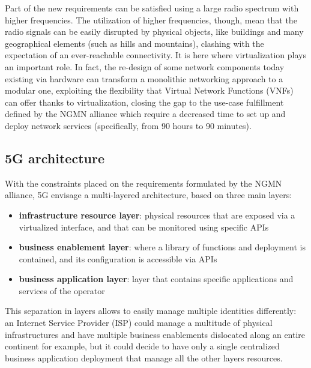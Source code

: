 Part of the new requirements can be satisfied using a large radio spectrum with
higher frequencies. The utilization of higher frequencies, though, mean that the
radio signals can be easily disrupted by physical objects, like buildings and
many geographical elements (such as hills and mountains), clashing with the
expectation of an ever-reachable connectivity. It is here where virtualization
plays an important role. In fact, the re-design of some network components today
existing via hardware can transform a monolithic networking approach to a 
modular one, exploiting the flexibility that Virtual Network Functions 
(VNFs) can offer thanks to virtualization, closing the gap to the use-case 
fulfillment defined by the NGMN alliance which require a decreased time to set up and deploy network 
services (specifically, from 90 hours to 90 minutes).

\subsection{5G architecture}

With the constraints placed on the requirements formulated by the NGMN alliance,
5G envisage a multi-layered architecture, based on three main layers:
\begin{itemize}
\item \textbf{infrastructure resource layer}: physical resources that are 
exposed via a virtualized interface, and that can be monitored using specific 
APIs
\item \textbf{business enablement layer}: where a library of functions and
  deployment is contained, and its configuration is accessible via APIs
\item \textbf{business application layer}: layer that contains specific
  applications and services of the operator
\end{itemize}


This separation in layers allows to easily manage multiple identities 
differently: an Internet Service Provider (ISP) could manage a multitude of 
physical infrastructures and have multiple business enablements dislocated 
along an entire continent for example, but it could decide to have only a 
single centralized business application deployment that manage all the other 
layers resources.

